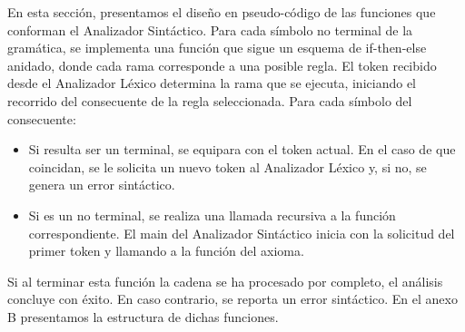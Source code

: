 En esta sección, presentamos el diseño en pseudo-código de las funciones que conforman el Analizador Sintáctico. Para cada símbolo no terminal de la gramática, se implementa una función que sigue un esquema de if-then-else anidado, donde cada rama corresponde a una posible regla. El token recibido desde el Analizador Léxico determina la rama que se ejecuta, iniciando el recorrido del consecuente de la regla seleccionada. Para cada símbolo del consecuente:

\begin{itemize}
    \item Si resulta ser un terminal, se equipara con el token actual. En el caso de que coincidan, se le solicita un nuevo token al Analizador Léxico y, si no, se genera un error sintáctico. 
    \item Si es un no terminal, se realiza una llamada recursiva a la función correspondiente. El main del Analizador Sintáctico inicia con la solicitud del primer token y llamando a la función del axioma. 
\end{itemize}

Si al terminar esta función la cadena se ha procesado por completo, el análisis concluye con éxito. En caso contrario, se reporta un error sintáctico. En el anexo B presentamos la estructura de dichas funciones.